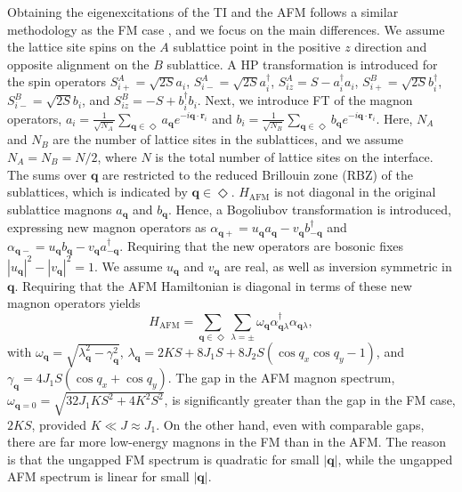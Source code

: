 \documentclass[aps, prb, twocolumn,amsmath,amssymb,floatfix]{revtex4-2}
\begin{document}
Obtaining the eigenexcitations of the TI and the AFM follows a similar methodology as the FM case \cite{EirikTIFMAFM}, and we focus on the main differences. We assume the lattice site spins on the $A$ sublattice point in the positive $z$ direction and opposite alignment on the $B$ sublattice. A HP transformation is introduced for the spin operators $S_{i+}^A = \sqrt{2S}a_i$, $S_{i-}^A = \sqrt{2S}a_i^\dagger$, $S_{iz}^A = S - a_i^\dagger a_i$, $S_{i+}^B = \sqrt{2S}b_i^\dagger$, $S_{i-}^B = \sqrt{2S}b_i$, and $S_{iz}^B = -S + b_i^\dagger b_i$. Next, we introduce FT of the magnon operators, $a_i = \frac{1}{\sqrt{N_A}}\sum_{\boldsymbol{q}\in\Diamond}a_{\boldsymbol{q}}e^{-i\boldsymbol{q}\cdot \boldsymbol{r}_i}$ and $b_i = \frac{1}{\sqrt{N_B}}\sum_{\boldsymbol{q}\in\Diamond}b_{\boldsymbol{q}}e^{-i\boldsymbol{q}\cdot \boldsymbol{r}_i}$. Here, $N_A$ and $N_B$ are the number of lattice sites in the sublattices, and we assume $N_A = N_B = N/2$, where $N$ is the total number of lattice sites on the interface. The sums over $\boldsymbol{q}$ are restricted to the reduced Brillouin zone (RBZ) of the sublattices, which is indicated by $\boldsymbol{q} \in \Diamond$. $H_{\textrm{AFM}}$ is not diagonal in the original sublattice magnons $a_{\boldsymbol{q}} $ and $b_{\boldsymbol{q}} $. Hence, a Bogoliubov transformation is introduced, expressing new magnon operators as $\alpha_{\boldsymbol{q}+} = u_{\boldsymbol{q}}a_{\boldsymbol{q}} - v_{\boldsymbol{q}}b_{-\boldsymbol{q}}^\dagger $ and $\alpha_{\boldsymbol{q}-} =  u_{\boldsymbol{q}}b_{\boldsymbol{q}} - v_{\boldsymbol{q}}a_{-\boldsymbol{q}}^\dagger$. Requiring that the new operators are bosonic fixes $|u_{\boldsymbol{q}}|^2-|v_{\boldsymbol{q}}|^2 = 1$. We assume $u_{\boldsymbol{q}}$ and $v_{\boldsymbol{q}}$ are real, as well as inversion symmetric in $\boldsymbol{q}$. Requiring that the AFM Hamiltonian is diagonal in terms of these new magnon operators yields
\begin{equation}
    H_{\textrm{AFM}} = \sum_{\boldsymbol{q}\in\Diamond} \sum_{\lambda = \pm} \omega_{\boldsymbol{q}} \alpha_{\boldsymbol{q}\lambda}^\dagger\alpha_{\boldsymbol{q}\lambda},
\end{equation}
with $\omega_{\boldsymbol{q}} = \sqrt{\lambda_{\boldsymbol{q}}^2-\gamma_{\boldsymbol{q}}^2}$, $\lambda_{\boldsymbol{q}} = 2KS + 8J_1S + 8J_2S(\cos q_x \cos q_y-1)$, and $\gamma_{\boldsymbol{q}} = 4J_1 S (\cos q_x + \cos q_y)$. The gap in the AFM magnon spectrum, $\omega_{\boldsymbol{q}=0} = \sqrt{32J_1KS^2+4K^2S^2}$, is significantly greater than the gap in the FM case, $2KS$, provided $K\ll J \approx J_1$.
On the other hand, even with comparable gaps, there are far more low-energy magnons in the FM than in the AFM. The reason is that the ungapped FM spectrum is quadratic for small $|\boldsymbol{q}|$, while the ungapped AFM spectrum is linear for small $|\boldsymbol{q}|$.
\end{document}
